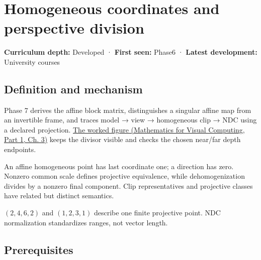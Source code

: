 \hypertarget{appendix-cb3b26862282}{}\label{referencestart:appendix-cb3b26862282}
\section{Homogeneous coordinates and perspective division}\label{appendix-cb3b26862282-homogeneous-coordinates-and-perspective-division}

\hypertarget{appendix-cb3b26862282-homogeneous-coordinates-and-perspective-division}{}

\textbf{Curriculum depth:} Developed · \textbf{First seen:} Phase6 · \textbf{Latest development:} University courses

\begin{allmightroledefinition}

\subsection{Definition and mechanism}\label{appendix-cb3b26862282-definition-and-mechanism}

\hypertarget{appendix-cb3b26862282-definition-and-mechanism}{}

Phase 7 derives the affine block matrix, distinguishes a singular affine map from an invertible frame, and traces model → view → homogeneous clip → NDC using a declared projection. \href{../02-Mathematics-for-Visual-Computing-P01/main.pdf\#01-foundations-i-ch019-figure-m6---follow-one-point-through-named-spaces}{The worked figure (Mathematics for Visual Computing, Part 1, Ch. 3)} keeps the divisor visible and checks the chosen near/far depth endpoints.

\end{allmightroledefinition}

An affine homogeneous point has last coordinate one; a direction has zero. Nonzero common scale defines projective equivalence, while dehomogenization divides by a nonzero final component. Clip representatives and projective classes have related but distinct semantics.

\((2,4,6,2)\) and \((1,2,3,1)\) describe one finite projective point. NDC normalization standardizes ranges, not vector length.

\subsection{Prerequisites}\label{appendix-cb3b26862282-prerequisites}

\hypertarget{appendix-cb3b26862282-prerequisites}{}

